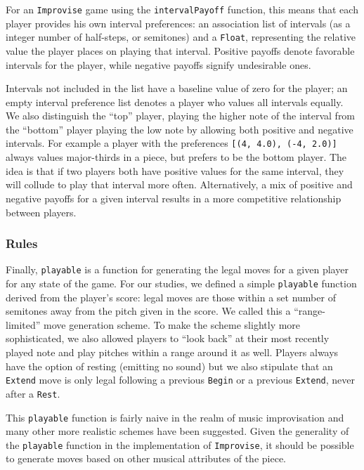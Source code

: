 \documentclass{article}
\begin{document}
For an \texttt{Improvise} game using the \texttt{intervalPayoff} function, this
means that each player provides his own interval preferences: an
association list of intervals (as a integer number of half-steps, or
semitones) and a \texttt{Float}, representing the relative value the player
places on playing that interval. Positive payoffs denote favorable
intervals for the player, while negative payoffs signify undesirable
ones.

Intervals not included in the list have a baseline value of zero for the
player; an empty interval preference list denotes a player who values
all intervals equally. We also distinguish the ``top'' player, playing
the higher note of the interval from the ``bottom'' player playing the
low note by allowing both positive and negative intervals. For example a
player with the preferences \texttt{{[}(4, 4.0), (-4, 2.0){]}} always
values major-thirds in a piece, but prefers to be the bottom player. The
idea is that if two players both have positive values for the same
interval, they will collude to play that interval more often.
Alternatively, a mix of positive and negative payoffs for a given
interval results in a more competitive relationship between players.

\subsubsection{Rules}
Finally, \texttt{playable} is a function for generating the legal moves
for a given player for any state of the game. 
For our studies, we defined a simple \texttt{playable}
function derived from the player's score: legal moves are those within a
set number of semitones away from the pitch given in the score. We
called this a ``range-limited'' move generation scheme. To make the
scheme slightly more sophisticated, we also allowed players to ``look
back'' at their most recently played note and play pitches within a
range around it as well. Players always have the option of
resting (emitting no sound) but we also stipulate that an \texttt{Extend} move is
only legal following a previous \texttt{Begin} or a previous \texttt{Extend}, never after
a \texttt{Rest}.

This \texttt{playable} function is fairly naive in the realm of music
improvisation and many other more realistic schemes have been suggested.
Given the generality of the \texttt{playable} function in the
implementation of \texttt{Improvise}, it should be possible to generate moves
based on other musical attributes of the piece.
\end{document}
